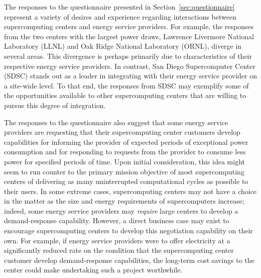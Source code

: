The responses to the questionnaire presented in
Section~\ref{sec:questionnaire} represent a variety of desires and
experience regarding interactions between supercomputing centers and
energy service providers.  For example, the responses from the two centers
with the largest power draws, Lawrence Livermore National Laboratory
(LLNL) and Oak Ridge National Laboratory (ORNL), diverge in several
areas.  This divergence is perhaps primarily due to characteristics of
their respective energy service providers.  In contrast, San Diego
Supercomputer Center (SDSC) stands out as a leader in integrating
with their energy service provider on a site-wide level.  To that end, the
responses from SDSC may exemplify some of the opportunities available
to other supercomputing centers that are willing to pursue this degree
of integration.

The responses to the questionnaire also suggest that some energy service
providers are requesting that their supercomputing center customers
develop capabilities for informing the provider of expected periods of
exceptional power consumption and for responding to requests from the
provider to consume less power for specified periods of time.  Upon
initial consideration, this idea might seem to run counter to the
primary mission objective of most supercomputing centers of delivering
as many uninterrupted computational cycles as possible to their users.
In some extreme cases, supercomputing centers may not have a choice
in the matter as the size and energy requirements of supercomputers
increase; indeed, some energy service providers may \textit{require} large
centers to develop a demand-response capability.  However, a direct
business case may exist to encourage supercomputing centers to develop
this negotiation capability on their own.  For example, if energy service
providers were to offer electricity at a significantly reduced rate
on the condition that the supercomputing center customer develop
demand-response capabilities, the long-term cost savings to the
center could make undertaking such a project worthwhile.

